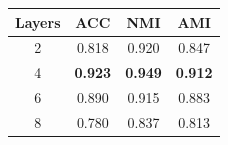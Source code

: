  


\begin{tabular}{cccc}
\hline
Layers  & ACC & NMI & AMI \\
\hline
2 & 0.818 & 0.920 & 0.847 \\
4 & \textbf{0.923} & \textbf{0.949} & \textbf{0.912} \\
6 & 0.890 & 0.915 & 0.883 \\
8 & 0.780 & 0.837 & 0.813 \\
\hline
\end{tabular}









